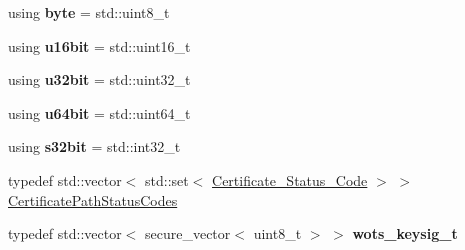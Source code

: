 \begin{DoxyCompactItemize}
\item 
\mbox{\label{namespace_botan_ac1a6663b490db3d485027ee7703601d0}} 
using {\bfseries byte} = std\+::uint8\+\_\+t
\item 
\mbox{\label{namespace_botan_a505815f98fab07277691987697db779b}} 
using {\bfseries u16bit} = std\+::uint16\+\_\+t
\item 
\mbox{\label{namespace_botan_a27a94f72aafbd2a2f42d4fbc33b36a42}} 
using {\bfseries u32bit} = std\+::uint32\+\_\+t
\item 
\mbox{\label{namespace_botan_a05eb3f748538b76716c6868660cb6ab3}} 
using {\bfseries u64bit} = std\+::uint64\+\_\+t
\item 
\mbox{\label{namespace_botan_a227f63d988c9a6238cca19b2c32e79f9}} 
using {\bfseries s32bit} = std\+::int32\+\_\+t
\item 
typedef std\+::vector$<$ std\+::set$<$ \hyperlink{namespace_botan_ae1e907dc90937bdda30f65216e68ff2b}{Certificate\+\_\+\+Status\+\_\+\+Code} $>$ $>$ \hyperlink{namespace_botan_a013252aabcb201e0d27b60b1e690886b}{Certificate\+Path\+Status\+Codes}
\item 
\mbox{\label{namespace_botan_a6adeb3982e716829a15535f6dfe5d831}} 
typedef std\+::vector$<$ secure\+\_\+vector$<$ uint8\+\_\+t $>$ $>$ {\bfseries wots\+\_\+keysig\+\_\+t}
\end{DoxyCompactItemize}
